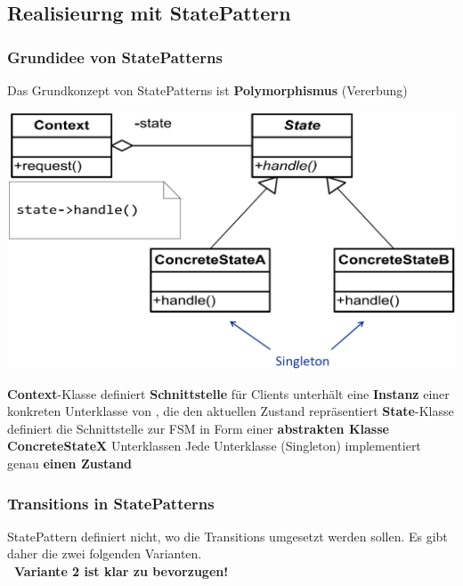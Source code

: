 \columnbreak


\subsection{Realisieurng mit StatePattern}

\subsubsection{Grundidee von StatePatterns}
\label{Grundidee StatePatterns}

Das Grundkonzept von StatePatterns ist \textbf{Polymorphismus} (Vererbung)

\begin{center}
    \includegraphics[width=0.8\columnwidth]{images/fsm_state_pattern_struktur.png}
\end{center}

\begin{outline}
    \1 \textbf{Context}-Klasse
        \2 definiert \textbf{Schnittstelle} für Clients
        \2 unterhält eine \textbf{Instanz} einer konkreten Unterklasse von , die den aktuellen Zustand repräsentiert
    \1 \textbf{State}-Klasse
        \2 definiert die Schnittstelle zur FSM in Form einer \textbf{abstrakten Klasse}
    \1 \textbf{ConcreteStateX} Unterklassen
        \2 Jede Unterklasse (Singleton) implementiert genau \textbf{einen Zustand}
\end{outline}


\subsubsection{Transitions in StatePatterns}

StatePattern definiert nicht, wo die Transitions umgesetzt werden sollen. Es gibt daher die zwei folgenden Varianten. \\
\textbf{ \textrightarrow\ Variante 2 ist klar zu bevorzugen!}

